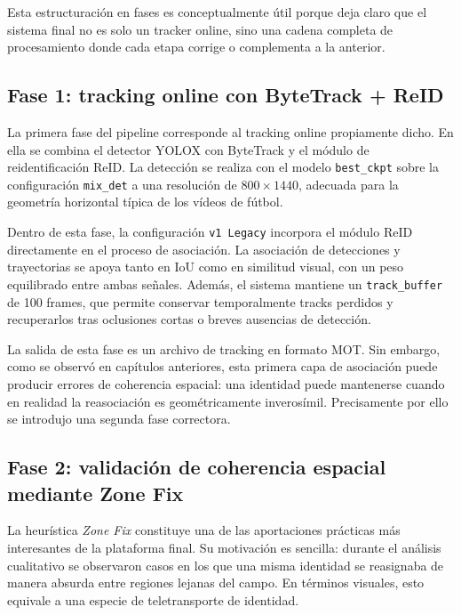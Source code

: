 \documentclass[../MAIN.tex]{subfiles}
\begin{document}
	
	Esta estructuración en fases es conceptualmente útil porque deja claro que el sistema final no es solo un tracker online, sino una cadena completa de procesamiento donde cada etapa corrige o complementa a la anterior.
	
	\subsection{Fase 1: tracking online con ByteTrack + ReID}
	
	La primera fase del pipeline corresponde al tracking online propiamente dicho. En ella se combina el detector YOLOX con ByteTrack y el módulo de reidentificación ReID. La detección se realiza con el modelo \texttt{best\_ckpt} sobre la configuración \texttt{mix\_det} a una resolución de \(800 \times 1440\), adecuada para la geometría horizontal típica de los vídeos de fútbol.
	
	Dentro de esta fase, la configuración \texttt{v1 Legacy} incorpora el módulo ReID directamente en el proceso de asociación. La asociación de detecciones y trayectorias se apoya tanto en IoU como en similitud visual, con un peso equilibrado entre ambas señales. Además, el sistema mantiene un \texttt{track\_buffer} de 100 frames, que permite conservar temporalmente tracks perdidos y recuperarlos tras oclusiones cortas o breves ausencias de detección.
	
	La salida de esta fase es un archivo de tracking en formato MOT. Sin embargo, como se observó en capítulos anteriores, esta primera capa de asociación puede producir errores de coherencia espacial: una identidad puede mantenerse cuando en realidad la reasociación es geométricamente inverosímil. Precisamente por ello se introdujo una segunda fase correctora.
	
	\subsection{Fase 2: validación de coherencia espacial mediante Zone Fix}
	
	La heurística \textit{Zone Fix} constituye una de las aportaciones prácticas más interesantes de la plataforma final. Su motivación es sencilla: durante el análisis cualitativo se observaron casos en los que una misma identidad se reasignaba de manera absurda entre regiones lejanas del campo. En términos visuales, esto equivale a una especie de teletransporte de identidad.
	
\end{document}
